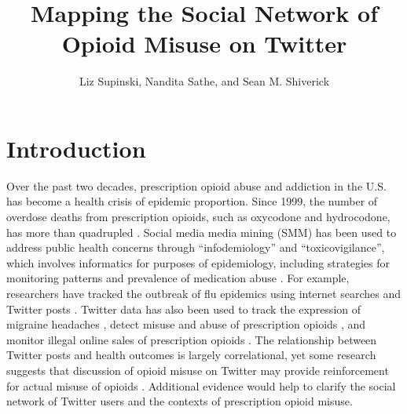 \documentclass[sigconf]{acmart}
\begin{document}
\title{Mapping the Social Network of Opioid Misuse on Twitter}


\author{Liz Supinski, Nandita Sathe, and Sean M. Shiverick}

\renewcommand{\shortauthors}{Supinski, Sathe, Shiverick}




\maketitle


\section{Introduction}

Over the past two decades, prescription opioid abuse and addiction in the U.S. 
has become a health crisis of epidemic proportion. Since 1999, the number of 
overdose deaths from prescription opioids, such as oxycodone and hydrocodone, 
has more than quadrupled \cite{nida18, cdc18}. Social media media mining (SMM) 
has been used to address public health concerns through ``infodemiology'' and 
``toxicovigilance'', which involves informatics for purposes of epidemiology, 
including strategies for monitoring patterns and prevalence of medication abuse 
\cite{eysenbach09, sarker16}. For example, researchers have tracked the outbreak 
of flu epidemics using internet searches and Twitter posts 
\cite{culotta10, paul14, lazer14}. Twitter data has also been used to track 
the expression of migraine headaches \cite{nascimento14}, detect misuse 
and abuse of prescription opioids \cite{sarker16, chary17, dzierak17}, and 
monitor illegal online sales of prescription opioids \cite{mackey17}. 
The relationship between Twitter posts and health outcomes is largely 
correlational, yet some research suggests that discussion of opioid misuse 
on Twitter may provide reinforcement for actual misuse of opioids 
\cite{hanson13}. Additional evidence would help to clarify the social network 
of Twitter users and the contexts of prescription opioid misuse. 
\end{document}
